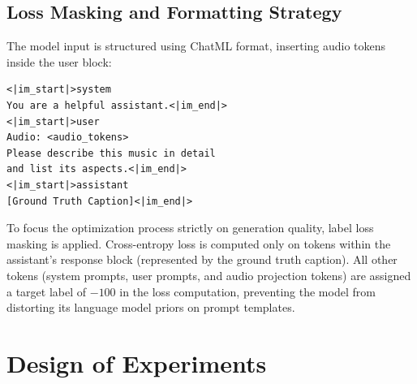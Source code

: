 \documentclass[12pt, conference, letterpaper]{IEEEtran}
\begin{document}
\subsection{Loss Masking and Formatting Strategy}
The model input is structured using ChatML format, inserting audio tokens inside the user block:
\begin{verbatim}
<|im_start|>system
You are a helpful assistant.<|im_end|>
<|im_start|>user
Audio: <audio_tokens>
Please describe this music in detail 
and list its aspects.<|im_end|>
<|im_start|>assistant
[Ground Truth Caption]<|im_end|>
\end{verbatim}
To focus the optimization process strictly on generation quality, label loss masking is applied. Cross-entropy loss is computed only on tokens within the assistant's response block (represented by the ground truth caption). All other tokens (system prompts, user prompts, and audio projection tokens) are assigned a target label of $-100$ in the loss computation, preventing the model from distorting its language model priors on prompt templates.

\section{Design of Experiments}
\label{sec:experimental_design}
\end{document}
